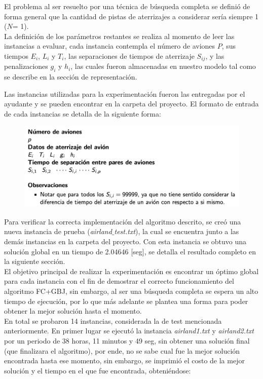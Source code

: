 \documentclass[letter, 10pt]{article}
\begin{document}
El problema al ser resuelto por una técnica de búsqueda completa se definió de forma general que la cantidad de pistas de aterrizajes a considerar sería siempre 1 ($N$= 1).\\

La definición de los parámetros restantes se realiza al momento de leer las instancias a evaluar, cada instancia contempla el número de aviones $P$, sus tiempos $E_i$, $L_i$ y $T_i$, las separaciones de tiempos de aterrizaje $S_{ij}$, y las penalizaciones $g_i$ y $h_i$, las cuales fueron almacenadas en nuestro modelo tal como se describe en la sección de representación.

Las instancias utilizadas para la experimentación fueron las entregadas por el ayudante y se pueden encontrar en la carpeta del proyecto. El formato de entrada de cada instancias se detalla de la siguiente forma:
\begin{figure}[h]
    \centering
    \includegraphics[width=13cm]{detalleInstancia.png}
\end{figure}

Para verificar la correcta implementación del algoritmo descrito, se creó una nueva instancia de prueba (\textit{airland$\_$test.txt}), la cual se encuentra junto a las demás instancias en la carpeta del proyecto. Con esta instancia se obtuvo una solución global en un tiempo de 2.04646 [seg], se detalla el resultado completo en la siguiente sección.\\
El objetivo principal de realizar la experimentación es encontrar un óptimo global para cada instancia con el fin de demostrar el correcto funcionamiento del algoritmo FC+GBJ, sin embargo, al ser una búsqueda completa se espera un alto tiempo de ejecución, por lo que más adelante se plantea una forma para poder obtener la mejor solución hasta el momento.\\

En total se probaron 14 instancias, considerada la de test mencionada anteriormente. En primer lugar se ejecutó la instancia \textit{airland1.txt} y \textit{airland2.txt} por un periodo de 38 horas, 11 minutos y 49 seg, sin obtener una solución final (que finalizara el algoritmo), por ende, no se sabe cual fue la mejor solución encontrada hasta ese momento, sin embargo, se imprimió el costo de la mejor solución y el tiempo en el que fue encontrada, obteniéndose: 
\end{document}
